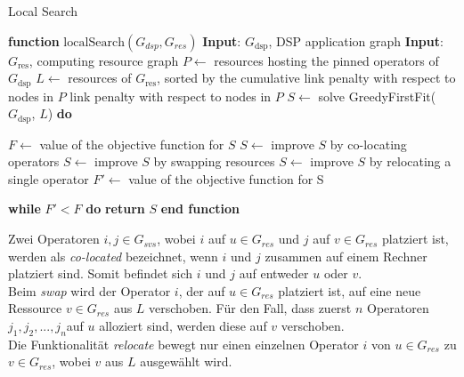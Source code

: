\documentclass{article}
\begin{document}
\begin{algorithm}[H]
    \caption{Local Search}
    \begin{algorithmic}[1]
        \STATE \textbf{function} $\mathrm{localSearch}(G_{dsp}, G_{res})$
        \STATE \textbf{Input}: $G_{\text{dsp}}$, DSP application graph
        \STATE \textbf{Input}: $G_{\text{res}}$, computing resource graph
        \STATE $P \leftarrow$ resources hosting the pinned operators of $G_{\text{dsp}}$
        \STATE $L \leftarrow$ resources of $G_{\text{res}}$, 
        sorted by the cumulative link penalty with respect to nodes in $P$
        \STATE link penalty with respect to nodes in $P$
        \STATE $S \leftarrow$  solve GreedyFirstFit($G_{\text{dsp}}$, $L$)
        \STATE \textbf{do}

        \STATE \hspace{\algorithmicindent} $F \leftarrow$  value of the objective function for $S$
        \STATE \hspace{\algorithmicindent} $S \leftarrow$  improve $S$ by co-locating operators
        \STATE \hspace{\algorithmicindent} $S \leftarrow$  improve $S$ by swapping resources
        \STATE \hspace{\algorithmicindent} $S \leftarrow$  improve $S$ by relocating a single operator
        \STATE \hspace{\algorithmicindent} $F' \leftarrow$ value of the objective function for S

        \STATE \textbf{while} $F'  < F$ \textbf{do}
        \STATE \hspace{\algorithmicindent} \textbf{return} $S$
        \STATE \textbf{end function}
    \end{algorithmic}
    \label{local-search-algo}
\end{algorithm}


Zwei Operatoren $i,j \in G_{svs}$, wobei $i$ auf $u \in G_{res}$ und $j$ auf $v \in G_{res}$ platziert ist, werden als \textit{co-located} bezeichnet, 
wenn $i$ und $j$ zusammen auf einem Rechner platziert sind. Somit befindet sich $i$ und $j$ auf entweder $u$ oder $v$.\\
Beim \textit{swap} wird der Operator $i$, der auf $u \in G_{res}$ platziert ist, auf eine neue Ressource $v \in G_{res}$ aus $L$ verschoben. 
Für den Fall, dass zuerst $n$ Operatoren $j_1, j_2, ..., j_n$auf $u$ alloziert sind, werden diese auf $v$ verschoben. \\ 
Die Funktionalität \textit{relocate}  bewegt nur einen einzelnen Operator $i$ von $u \in G_{res}$ zu $v \in G_{res}$, 
wobei $v$ aus $L$ ausgewählt wird. 
\end{document}
